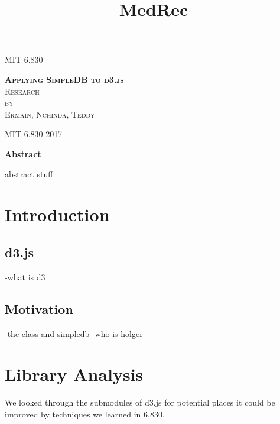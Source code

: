 \documentclass[a4paper]{article}
\begin{document}
\title{MedRec}

\begin{titlepage}
\begin{center}

\textsc{\Large MIT 6.830}\\[4em]

\vspace{4em}

\textsc{\huge \textbf{Applying SimpleDB to d3.js}}\\[4em]

\textsc{\large Research}\\[1em]

\textsc{by}\\[1em]

\textsc{\Large Ermain, Nchinda, Teddy}\\[1em]

\end{center}

\vspace*{\fill}
\textsc{MIT 6.830\hspace*{\fill} 2017}

\end{titlepage}
\begin{center}
{\large\bf{Abstract\\}}
\end{center}
abstract stuff
\tableofcontents\label{c}
\newpage


\section{Introduction} \label{overview}%
\subsection{d3.js}
-what is d3
\subsection{Motivation}
-the class and simpledb
-who is holger
\section{Library Analysis}
We looked through the submodules of d3.js for potential places it could be improved by techniques we learned in 6.830.
\end{document}
